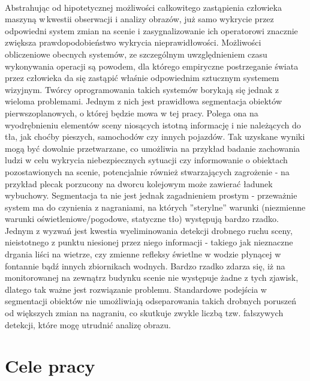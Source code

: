\paragraph{}
Abstrahując od hipotetycznej możliwości całkowitego zastąpienia człowieka maszyną w\,kwestii obserwacji i analizy obrazów, już samo wykrycie przez odpowiedni system zmian na scenie i zasygnalizowanie ich operatorowi znacznie zwiększa prawdopodobieństwo wykrycia nieprawidłowości. Możliwości obliczeniowe obecnych systemów, ze szczególnym uwzględnieniem czasu wykonywania operacji są powodem, dla którego empiryczne postrzeganie świata przez człowieka da się zastąpić właśnie odpowiednim sztucznym systemem wizyjnym. Twórcy oprogramowania takich systemów borykają się jednak z wieloma problemami. Jednym z nich jest prawidłowa segmentacja obiektów pierwszoplanowych, o której będzie mowa w tej pracy. Polega ona na wyodrębnieniu elementów sceny niosących istotną informację i nie należących do tła, jak choćby pieszych, samochodów czy innych pojazdów. Tak uzyskane wyniki mogą być dowolnie przetwarzane, co umożliwia na przykład badanie zachowania ludzi w celu wykrycia niebezpiecznych sytuacji czy informowanie o obiektach pozostawionych na scenie, potencjalnie również stwarzających zagrożenie - na przykład plecak porzucony na dworcu kolejowym może zawierać ładunek wybuchowy. Segmentacja ta nie jest jednak zagadnieniem prostym - przeważnie system ma do czynienia z nagraniami, na których ''sterylne'' warunki (niezmienne warunki oświetleniowe/pogodowe, statyczne tło) występują bardzo rzadko. Jednym z wyzwań jest kwestia wyeliminowania detekcji drobnego ruchu sceny, nieistotnego z punktu niesionej przez niego informacji - takiego jak nieznaczne drgania liści na wietrze, czy zmienne refleksy świetlne w wodzie płynącej w fontannie bądź innych zbiornikach wodnych. Bardzo rzadko zdarza się, iż na monitorowanej na zewnątrz budynku scenie nie występuje żadne z tych zjawisk, dlatego tak ważne jest rozwiązanie problemu. Standardowe podejścia w\,segmentacji obiektów nie umożliwiają odseparowania takich drobnych poruszeń od większych zmian na nagraniu, co skutkuje zwykle liczbą tzw. fałszywych detekcji, które mogę utrudnić analizę obrazu.


\section{Cele pracy}
\label{sec:celePracy}

